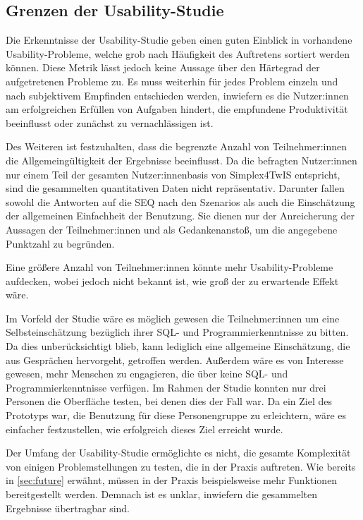 \subsection{Grenzen der Usability-Studie}
Die Erkenntnisse der Usability-Studie geben einen guten Einblick in vorhandene Usability-Probleme, welche grob nach Häufigkeit des Auftretens sortiert werden können. Diese Metrik lässt jedoch keine Aussage über den Härtegrad der aufgetretenen Probleme zu. Es muss weiterhin für jedes Problem einzeln und nach subjektivem Empfinden entschieden werden, inwiefern es die Nutzer:innen am erfolgreichen Erfüllen von Aufgaben hindert, die empfundene Produktivität beeinflusst oder zunächst zu vernachlässigen ist.

\pskip
Des Weiteren ist festzuhalten, dass die begrenzte Anzahl von Teilnehmer:innen die Allgemeingültigkeit der Ergebnisse beeinflusst. Da die befragten Nutzer:innen nur einem Teil der gesamten Nutzer:innenbasis von Simplex4TwIS entspricht, sind die gesammelten quantitativen Daten nicht repräsentativ. Darunter fallen sowohl die Antworten auf die \ac{SEQ} nach den Szenarios als auch die Einschätzung der allgemeinen Einfachheit der Benutzung. Sie dienen nur der Anreicherung der Aussagen der Teilnehmer:innen und als Gedankenanstoß, um die angegebene Punktzahl zu begründen.

Eine größere Anzahl von Teilnehmer:innen könnte mehr Usability-Probleme aufdecken, wobei jedoch nicht bekannt ist, wie groß der zu erwartende Effekt wäre.

\pskip
Im Vorfeld der Studie wäre es möglich gewesen die Teilnehmer:innen um eine Selbsteinschätzung bezüglich ihrer \ac{SQL}- und Programmierkenntnisse zu bitten. Da dies unberücksichtigt blieb, kann lediglich eine allgemeine Einschätzung, die aus Gesprächen hervorgeht, getroffen werden. Außerdem wäre es von Interesse gewesen, mehr Menschen zu engagieren, die über keine \ac{SQL}- und Programmierkenntnisse verfügen. Im Rahmen der Studie konnten nur drei Personen die Oberfläche testen, bei denen dies der Fall war. Da ein Ziel des Prototyps war, die Benutzung für diese Personengruppe zu erleichtern, wäre es einfacher festzustellen, wie erfolgreich dieses Ziel erreicht wurde.

\pskip
Der Umfang der Usability-Studie ermöglichte es nicht, die gesamte Komplexität von einigen Problemstellungen zu testen, die in der Praxis auftreten. Wie bereits in \ref{sec:future} erwähnt, müssen in der Praxis beispielsweise mehr Funktionen bereitgestellt werden. Demnach ist es unklar, inwiefern die gesammelten Ergebnisse übertragbar sind.
